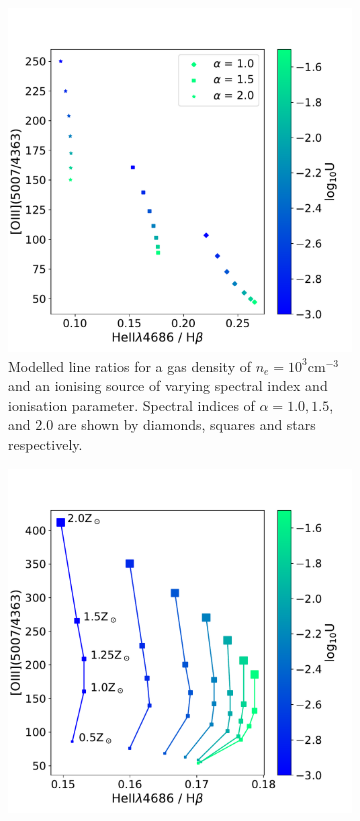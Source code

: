 \begin{figure}
    \begin{subfigure}[t]{0.49\textwidth}
        \includegraphics[width = \linewidth]{figures/heii_hb_oiii_photoionisation_modelling/3ne_a_vary_10z.pdf}
        \captionsetup{width=.9\linewidth}
        \caption{Modelled line ratios for a gas density of $n_e=10^3$\;cm$^{-3}$ and an ionising source of varying spectral index and ionisation parameter. Spectral indices of $\alpha=1.0, 1.5$, and $2.0$ are shown by diamonds, squares and stars respectively.}
        \label{fig: heii_hb_oiii_photoionisation_modelling: heii_hbeta_alpha}
    \end{subfigure}
    \hfill
    \begin{subfigure}[t]{0.49\textwidth}
        \includegraphics[width = \linewidth]{figures/heii_hb_oiii_photoionisation_modelling/3ne_15a_z_vary.pdf}

\end{subfigure}
\end{figure}

